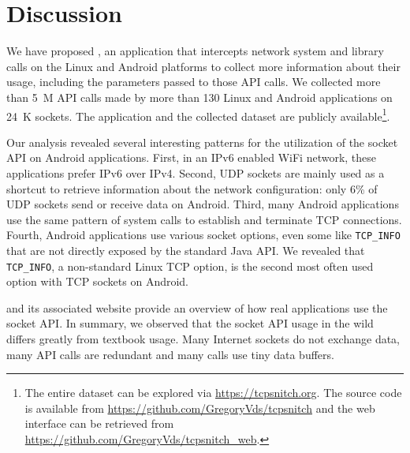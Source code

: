 \section{Discussion}\label{sec:conclusion}

We have proposed \tcpsnitchns, an application that intercepts network
system and library calls on the Linux and Android platforms to
collect more information about their usage, including the parameters
passed to those API calls. We collected more than 5~M API calls made by
more than 130 Linux and Android applications on 24~K sockets. The application
and the
collected dataset are publicly available\footnote{The entire dataset can be
explored via \url{https://tcpsnitch.org}. The \tcpsnitch source code is
available from \url{https://github.com/GregoryVds/tcpsnitch} and the web
interface can be retrieved from \url{https://github.com/GregoryVds/tcpsnitch_web}.
}.

Our analysis revealed several interesting patterns for the utilization
of the socket API on Android applications. First, in an IPv6 enabled
WiFi network, these applications prefer IPv6 over IPv4. Second, UDP sockets
are mainly used as a shortcut to retrieve information about the network
configuration: only 6\% of UDP sockets send or receive data on Android. Third, many
Android applications use the same pattern of system calls to establish and
terminate TCP connections. Fourth, Android applications use various socket
options, even some like \texttt{TCP\_INFO} that are not directly exposed by
the standard Java API. We revealed that \texttt{TCP\_INFO}, a non-standard
Linux TCP option, is the second most often used option with TCP sockets on
Android.

\tcpsnitch and its associated website provide an overview of how real
applications use the socket API. In summary, we observed that the socket API
usage in the wild differs greatly from textbook usage. Many Internet sockets
do not exchange data, many API calls are redundant and many calls use
tiny data buffers.
